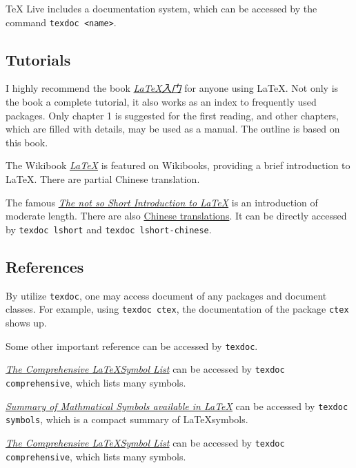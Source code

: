\documentclass[english]{pkupaper}
\begin{document}
TeX Live includes a documentation system, which can be accessed by the command \verb"texdoc <name>".

\subsection{Tutorials}

I highly recommend the book \href{https://item.jd.com/11258469.html}{\emph{\LaTeX 入门}} for anyone using LaTeX. Not only is the book a complete tutorial, it also works as an index to frequently used packages. Only chapter 1 is suggested for the first reading, and other chapters, which are filled with details, may be used as a manual. The outline is based on this book.

The Wikibook \href{https://en.wikibooks.org/wiki/LaTeX}{\emph{\LaTeX}} is featured on Wikibooks, providing a brief introduction to \LaTeX. There are partial Chinese translation.

The famous \href{https://www.ctan.org/tex-archive/info/lshort/english/}{\emph{The not so Short Introduction to \LaTeX}} is an introduction of moderate length. There are also \href{ https://www.ctan.org/tex-archive/info/lshort/chinese}{Chinese translations}. It can be directly accessed by \verb"texdoc lshort" and \verb"texdoc lshort-chinese".

\subsection{References}

By utilize \verb"texdoc", one may access document of any packages and document classes. For example, using \verb"texdoc ctex", the documentation of the package \verb"ctex" shows up.

Some other important reference can be accessed by \verb"texdoc".

\href{https://www.ctan.org/tex-archive/info/symbols/comprehensive/}{\emph{The Comprehensive \LaTeX Symbol List}} can be accessed by \verb"texdoc comprehensive", which lists many symbols.

\href{https://www.ctan.org/pkg/maths-symbols}{\emph{Summary of Mathmatical Symbols available in \LaTeX}} can be accessed by \verb"texdoc symbols", which is a compact summary of \LaTeX symbols.

\href{https://www.ctan.org/tex-archive/info/symbols/comprehensive/}{\emph{The Comprehensive \LaTeX Symbol List}} can be accessed by \verb"texdoc comprehensive", which lists many symbols.
\end{document}
